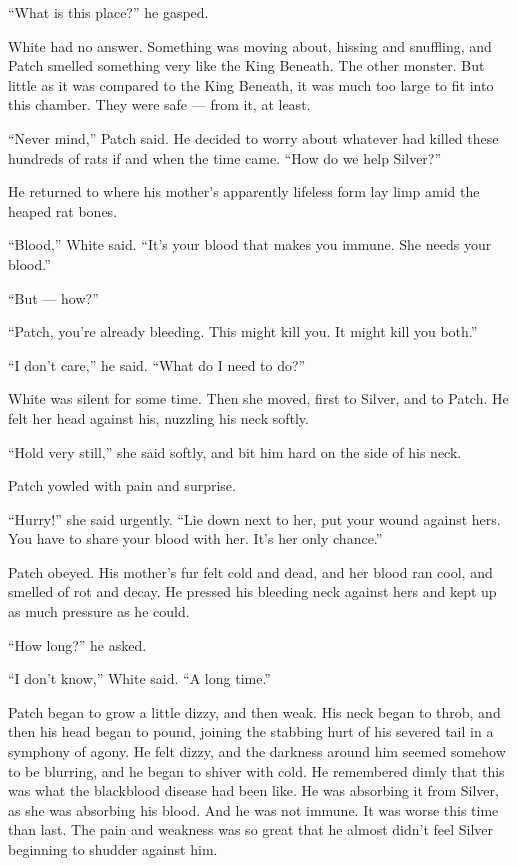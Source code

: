 \documentclass[ebook,oneside,openany,17pt]{memoir}
\newenvironment{tolerant}[1]{%
  \par\tolerance=#1\relax
}{%
  \par
}
\begin{document}
“What is this place?” he gasped.

\begin{tolerant}{2000}
White had no answer. Something was moving about, hissing and
snuffling, and Patch smelled something very like the King Beneath. The
other monster. But little as it was compared to the King Beneath, it
was much too large to fit into this chamber. They were safe — from it,
at least.
\end{tolerant}

“Never mind,” Patch said. He decided to worry about whatever had
killed these hundreds of rats if and when the time came. “How do we
help Silver?”

He returned to where his mother’s apparently lifeless form lay limp
amid the heaped rat bones.

“Blood,” White said. “It’s your blood that makes you immune. She needs
your blood.”

“But — how?”

“Patch, you’re already bleeding. This might kill you. It might kill
you both.”

“I don’t care,” he said. “What do I need to do?”

White was silent for some time. Then she moved, first to Silver, and
to Patch. He felt her head against his, nuzzling his neck softly.

“Hold very still,” she said softly, and bit him hard on the side of
his neck.

Patch yowled with pain and surprise.

“Hurry!” she said urgently. “Lie down next to her, put your wound
against hers. You have to share your blood with her. It’s her only
chance.”

Patch obeyed. His mother’s fur felt cold and dead, and her blood ran
cool, and smelled of rot and decay. He pressed his bleeding neck
against hers and kept up as much pressure as he could.

“How long?” he asked.

“I don’t know,” White said. “A long time.”

Patch began to grow a little dizzy, and then weak. His neck began to
throb, and then his head began to pound, joining the stabbing hurt of
his severed tail in a symphony of agony. He felt dizzy, and the
darkness around him seemed somehow to be blurring, and he began to
shiver with cold. He remembered dimly that this was what the
blackblood disease had been like. He was absorbing it from Silver, as
she was absorbing his blood. And he was not immune. It was worse this
time than last. The pain and weakness was so great that he almost
didn’t feel Silver beginning to shudder against him.
\end{document}
